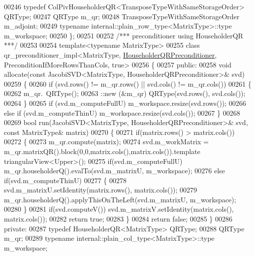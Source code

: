 \begin{DoxyCode}
00246   \textcolor{keyword}{typedef} ColPivHouseholderQR<TransposeTypeWithSameStorageOrder> QRType;
00247   QRType m\_qr;
00248   TransposeTypeWithSameStorageOrder m\_adjoint;
00249   \textcolor{keyword}{typename} internal::plain\_row\_type<MatrixType>::type m\_workspace;
00250 \};
00251 
00252 \textcolor{comment}{/*** preconditioner using HouseholderQR ***/}
00253 
00254 \textcolor{keyword}{template}<\textcolor{keyword}{typename} MatrixType>
00255 \textcolor{keyword}{class }qr\_preconditioner\_impl<MatrixType, \hyperlink{group__enums_gga46eba0d5c621f590b8cf1b53af31d56ea25d36655046e5910c850f62f84f34e25}{HouseholderQRPreconditioner}, 
      PreconditionIfMoreRowsThanCols, true>
00256 \{
00257 \textcolor{keyword}{public}:
00258   \textcolor{keywordtype}{void} allocate(\textcolor{keyword}{const} JacobiSVD<MatrixType, HouseholderQRPreconditioner>& svd)
00259   \{
00260     \textcolor{keywordflow}{if} (svd.rows() != m\_qr.rows() || svd.cols() != m\_qr.cols())
00261     \{
00262       m\_qr.~QRType();
00263       ::new (&m\_qr) QRType(svd.rows(), svd.cols());
00264     \}
00265     \textcolor{keywordflow}{if} (svd.m\_computeFullU) m\_workspace.resize(svd.rows());
00266     \textcolor{keywordflow}{else} \textcolor{keywordflow}{if} (svd.m\_computeThinU) m\_workspace.resize(svd.cols());
00267   \}
00268 
00269   \textcolor{keywordtype}{bool} run(JacobiSVD<MatrixType, HouseholderQRPreconditioner>& svd, \textcolor{keyword}{const} MatrixType& matrix)
00270   \{
00271     \textcolor{keywordflow}{if}(matrix.rows() > matrix.cols())
00272     \{
00273       m\_qr.compute(matrix);
00274       svd.m\_workMatrix = m\_qr.matrixQR().block(0,0,matrix.cols(),matrix.cols()).\textcolor{keyword}{template} 
      triangularView<Upper>();
00275       \textcolor{keywordflow}{if}(svd.m\_computeFullU) m\_qr.householderQ().evalTo(svd.m\_matrixU, m\_workspace);
00276       \textcolor{keywordflow}{else} \textcolor{keywordflow}{if}(svd.m\_computeThinU)
00277       \{
00278         svd.m\_matrixU.setIdentity(matrix.rows(), matrix.cols());
00279         m\_qr.householderQ().applyThisOnTheLeft(svd.m\_matrixU, m\_workspace);
00280       \}
00281       \textcolor{keywordflow}{if}(svd.computeV()) svd.m\_matrixV.setIdentity(matrix.cols(), matrix.cols());
00282       \textcolor{keywordflow}{return} \textcolor{keyword}{true};
00283     \}
00284     \textcolor{keywordflow}{return} \textcolor{keyword}{false};
00285   \}
00286 \textcolor{keyword}{private}:
00287   \textcolor{keyword}{typedef} HouseholderQR<MatrixType> QRType;
00288   QRType m\_qr;
00289   \textcolor{keyword}{typename} internal::plain\_col\_type<MatrixType>::type m\_workspace;

\end{DoxyCode}
